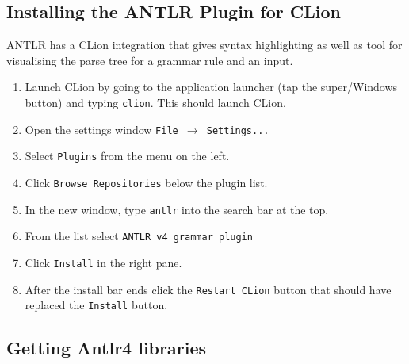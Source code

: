 \documentclass[../setup.tex]{subfiles}
\begin{document}
\subsection{Installing the ANTLR Plugin for CLion}
ANTLR has a CLion integration that gives syntax highlighting as well as tool for visualising the
parse tree for a grammar rule and an input.
\begin{enumerate}
  \item
    Launch CLion by going to the application launcher (tap the super/Windows button) and typing
    \lstinline{clion}. This should launch CLion.
  \item
    Open the settings window \texttt{File $\rightarrow$ Settings...}
  \item
    Select \texttt{Plugins} from the menu on the left.
  \item
    Click \texttt{Browse Repositories} below the plugin list.
  \item
    In the new window, type \texttt{antlr} into the search bar at the top.
  \item
    From the list select \lstinline{ANTLR v4 grammar plugin}
  \item
    Click \texttt{Install} in the right pane.
  \item
    After the install bar ends click the \texttt{Restart CLion} button that should have replaced
    the \texttt{Install} button.
\end{enumerate}


  \subsection{Getting Antlr4 libraries}
\end{document}
